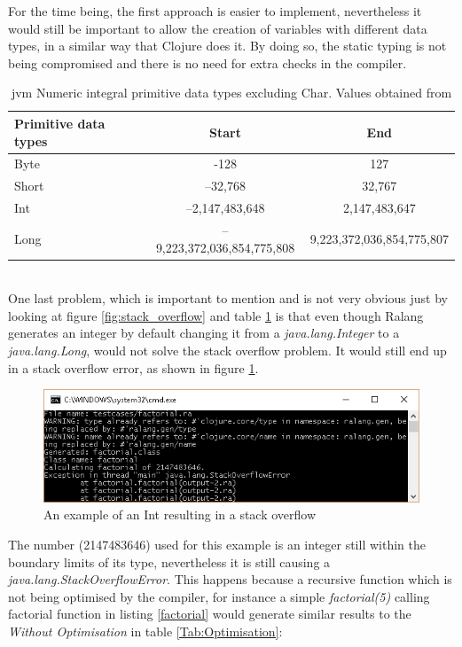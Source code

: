 \documentclass[a4paper]{article}
\begin{document}
	For the time being, the first approach is easier to implement, nevertheless it would still be important to allow the creation of variables with different data types, in a similar way that Clojure does it. By doing so, the static typing is not being compromised and there is no need for extra checks in the compiler.
	\begin{table}[h!]
		\begin{tabular}{|l|c|c|}
			\hline Primitive data types & Start & End \\ 
			\hline Byte & -128 & 127 \\ 
			\hline Short & –32,768 & 32,767  \\ 
			\hline Int & –2,147,483,648 & 2,147,483,647 \\ 
			\hline Long & –9,223,372,036,854,775,808 & 9,223,372,036,854,775,807 \\ 
			\hline 
		\end{tabular}
		\caption{\ac{jvm} Numeric integral primitive data types excluding Char. Values obtained from \cite{JVMSpec}}
		\label{Tab:JVMTypes}
	\end{table}\\
	One last problem, which is important to mention and is not very obvious just by looking at figure \ref{fig:stack_overflow} and table \ref{Tab:JVMTypes} is that even though Ralang generates an integer by default changing it from a \textit{java.lang.Integer} to a \textit{java.lang.Long}, would not solve the stack overflow problem. It would still end up in a stack overflow error, as shown in figure \ref{fig:int_stack_overflow}.
	\newpage
	\begin{figure}[h!]
		\centering
		\includegraphics[width=\linewidth]{images/int_stack_overflow.png}
		\caption{An example of an Int resulting in a stack overflow}
		\label{fig:int_stack_overflow}
	\end{figure}
	The number (2147483646) used for this example is an integer still within the boundary limits of its type, nevertheless it is still causing a \textit{java.lang.StackOverflowError}. This happens because a recursive function which is not being optimised by the compiler, for instance a simple \textit{factorial(5)} calling factorial function in listing \ref{factorial} would generate similar results to the \textit{Without Optimisation} in table \ref{Tab:Optimisation}:
\end{document}
